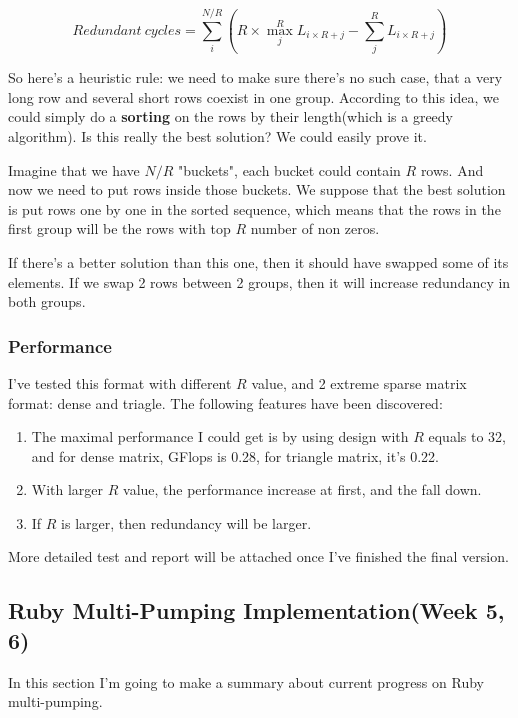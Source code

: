 \begin{equation}
Redundant\ cycles = \sum_{i}^{N/R} (R \times \max_{j}^{R} L_{i\times R + j} - \sum_{j}^{R} L_{i \times R + j})
\end{equation}

So here's a heuristic rule: we need to make sure there's no such case, that a very long row and several short rows coexist in one group. According to this idea, we could simply do a \textbf{sorting} on the rows by their length(which is a greedy algorithm). Is this really the best solution? We could easily prove it. 

Imagine that we have $N/R$ "buckets", each bucket could contain $R$ rows. And now we need to put rows inside those buckets. We suppose that the best solution is put rows one by one in the sorted sequence, which means that the rows in the first group will be the rows with top $R$ number of non zeros.

If there's a better solution than this one, then it should have swapped some of its elements. If we swap 2 rows between 2 groups, then it will increase redundancy in both groups.

\subsubsection{Performance}

I've tested this format with different $R$ value, and 2 extreme sparse matrix format: dense and triagle. The following features have been discovered:
\begin{enumerate}
\item The maximal performance I could get is by using design with $R$ equals to 32, and for dense matrix, GFlops is 0.28, for triangle matrix, it's 0.22.
\item With larger $R$ value, the performance increase at first, and the fall down.
\item If $R$ is larger, then redundancy will be larger.
\end{enumerate}

More detailed test and report will be attached once I've finished the final version.

\subsection{Ruby Multi-Pumping Implementation(Week 5, 6)}

In this section I'm going to make a summary about current progress on Ruby multi-pumping. 

